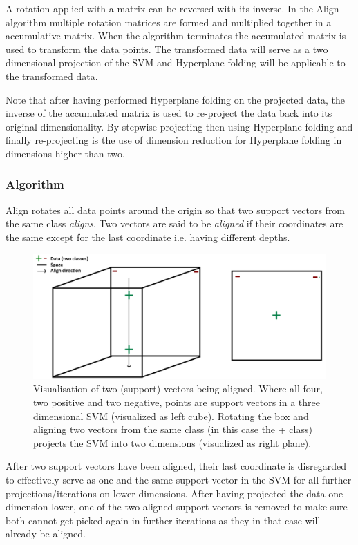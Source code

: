 \documentclass[a4paper,twoside]{bth}
\begin{document}
\par A rotation applied with a matrix can be reversed with its inverse. In the Align algorithm multiple rotation matrices are formed and multiplied together in a accumulative matrix.  When the algorithm terminates the accumulated matrix is used to transform the data points. The transformed data will serve as a two dimensional projection of the SVM and Hyperplane folding will be applicable to the transformed data. 
\par Note that after having performed Hyperplane folding on the projected data, the inverse of the accumulated matrix is used to re-project the data back into its original dimensionality. By stepwise projecting then using Hyperplane folding and finally re-projecting is the use of dimension reduction for Hyperplane folding in dimensions higher than two.

\subsubsection{Algorithm}
\par Align rotates all data points around the origin so that two support vectors from the same class \textit{aligns}. Two vectors are said to be \textit{aligned} if their coordinates are the same except for the last coordinate i.e. having different depths. 

\begin{figure}
\centering
\includegraphics[scale=0.3]{images/dimred_images/align2.png}
   \caption{Visualisation of two (support) vectors being aligned. Where all four, two positive and two negative, points are support vectors in a three dimensional SVM (visualized as left cube). Rotating the box and aligning two vectors from the same class (in this case the + class) projects the SVM into two dimensions (visualized as right plane).}
   \label{fig:align}
\end{figure}

\par After two support vectors have been aligned, their last coordinate is disregarded to effectively serve as one and the same support vector in the SVM for all further projections/iterations on lower dimensions. After having projected the data one dimension lower, one of the two aligned support vectors is removed to make sure both cannot get picked again in further iterations as they in that case will already be aligned.%
\end{document}
